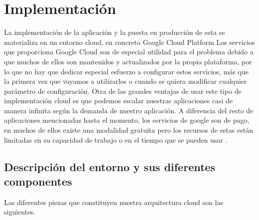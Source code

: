 \cleardoublepage
\mbox{}

\lstset{
language=Python,
basicstyle=\small\sffamily,
numbers=left,
numberstyle=\tiny,
frame=tb,
columns=fullflexible,
showstringspaces=false
}

\chapter{Implementación}
\label{ch:chapter4}
La implementación de la aplicación y la puesta en producción de esta se materializa en un entorno cloud, en concreto Google Cloud Platform
Los servicios que proporciona Google Cloud son de especial utilidad para el problema debido a que muchos de ellos son mantenidos y actualizados por la propia
plataforma, por lo que no hay que dedicar especial esfuerzo a configurar estos servicios, más que la primera vez que vayamos a utilizarlos o cuando se quiera
modificar cualquier parámetro de configuración.
Otra de las grandes ventajas de usar este tipo de implementación cloud es que podemos escalar nuestras
aplicaciones casi de manera infinita según la demanda de nuestro aplicación.
A diferencia del resto de aplicaciones mencionadas hasta el momento, los servicios de google son de pago, en muchos de ellos existe una modalidad gratuita pero los recursos de estas
están limitadas en su capacidad de trabajo o en el tiempo que se pueden usar .


\section{Descripción del entorno y sus diferentes componentes}\label{sec:descripción-del-entorno-y-sus-diferentes-componentes}
Las diferentes piezas que constituyen nuestra arquitectura cloud son las siguientes.


